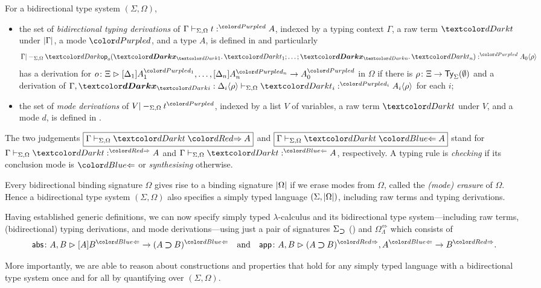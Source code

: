 \begin{defn}\label{def:bidirectional-typing-derivations}\label{def:mode-derivations}
  For a bidirectional type system $(\Sigma, \Omega)$,
  \begin{itemize}
    \item the set of \emph{bidirectional typing derivations} of $\Gamma \vdash_{\Sigma, \Omega} t :^\dir{d} A$, indexed by a typing context $\Gamma$, a raw term $\isTerm{t}$ under $\left|\Gamma\right|$, a mode $\dir{d}$, and a type $A$, is defined in  and particularly
          \[
            \Gamma |-_{\Sigma, \Omega} \tmOpts :^{\dir{d}} \simsub{A_0}{\rho}
          \]
          has a derivation for $\biop$ in $\Omega$ if there is $\rho\colon \Xi \to \mathsf{Ty}_{\Sigma}(\emptyset)$ and a derivation of $\Gamma, \vars{x}_{\isTerm{i}} : \simsub{\Delta_i}{\rho} \vdash_{\Sigma, \Omega} \isTerm{t_i} :^{\dir{d_i}} \simsub{A_i}{\rho}$ for each $i$;
    \item the set of \emph{mode derivations} of $V |-_{\Sigma, \Omega} t^\dir{d}$, indexed by a list $V$ of variables, a raw term $\isTerm{t}$ under $V$, and a mode $d$, is defined in .
  \end{itemize}
  The two judgements {\small$\boxed{\Gamma \vdash_{\Sigma, \Omega} \isTerm{t} \syn A}$} and {\small$\boxed{\Gamma \vdash_{\Sigma, \Omega} \isTerm{t} \chk A}$} stand for ${\Gamma \vdash_{\Sigma, \Omega} \isTerm{t} :^{\syn} A}$ and ${\Gamma \vdash_{\Sigma, \Omega} \isTerm{t} :^{\chk} A}$, respectively.
  A typing rule is \emph{checking} if its conclusion mode is $\chk$ or \emph{synthesising} otherwise.
\end{defn}

Every bidirectional binding signature $\Omega$ gives rise to a binding signature $\left|\Omega\right|$ if we erase modes from $\Omega$, called the \emph{(mode) erasure} of $\Omega$.
Hence a bidirectional type system $(\Sigma, \Omega)$ also specifies a simply typed language $(\Sigma, \left|\Omega\right|)$, including raw terms and typing derivations.

\begin{example}\label{ex:signature-simply-typed-lambda}
Having established generic definitions, we can now specify simply typed $\lambda$-calculus and its bidirectional type system---including raw terms, (bidirectional) typing derivations, and mode derivations---using just a pair of signatures $\Sigma_{\mathbin{\bm{\supset}}}$ () and $\Omega^{\Leftrightarrow}_\Lambda$ which consists of 
\[
  \aritysymbol{\mathsf{abs}}{A , B}{[A]B^{\chk}}{(A \bto B)^{\chk}}
  \quad\text{and}\quad
  \aritysymbol{\mathsf{app}}{A, B}{(A \bto B)^{\syn}, A^{\chk}}{B^{\syn}}.
\]
\end{example}
More importantly, we are able to reason about constructions and properties that hold for any simply typed language with a bidirectional type system once and for all by quantifying over $(\Sigma, \Omega)$.

